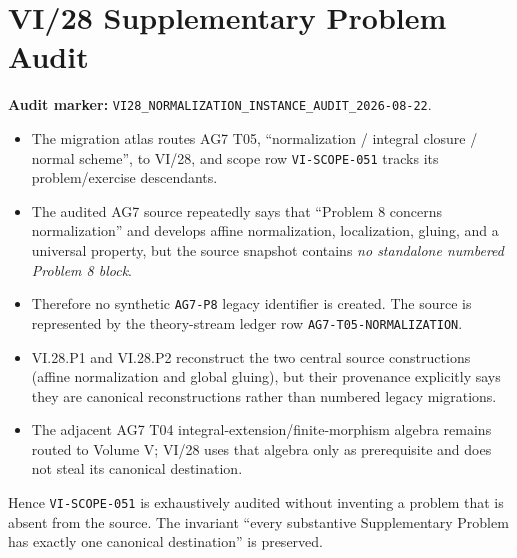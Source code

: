 \chapter*{VI/28 Supplementary Problem Audit}
\label{audit:vi28}
\textbf{Audit marker:} \texttt{VI28\_NORMALIZATION\_INSTANCE\_AUDIT\_2026-08-22}.

\begin{itemize}
\item The migration atlas routes AG7 T05, ``normalization / integral closure / normal scheme'', to VI/28, and scope row \texttt{VI-SCOPE-051} tracks its problem/exercise descendants.
\item The audited AG7 source repeatedly says that ``Problem 8 concerns normalization'' and develops affine normalization, localization, gluing, and a universal property, but the source snapshot contains \emph{no standalone numbered Problem 8 block}.
\item Therefore no synthetic \texttt{AG7-P8} legacy identifier is created.  The source is represented by the theory-stream ledger row \texttt{AG7-T05-NORMALIZATION}.
\item VI.28.P1 and VI.28.P2 reconstruct the two central source constructions (affine normalization and global gluing), but their provenance explicitly says they are canonical reconstructions rather than numbered legacy migrations.
\item The adjacent AG7 T04 integral-extension/finite-morphism algebra remains routed to Volume V; VI/28 uses that algebra only as prerequisite and does not steal its canonical destination.
\end{itemize}

Hence \texttt{VI-SCOPE-051} is exhaustively audited without inventing a problem that is absent from the source.  The invariant ``every substantive Supplementary Problem has exactly one canonical destination'' is preserved.
